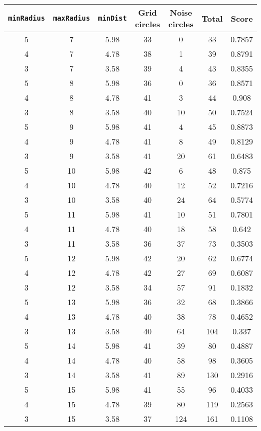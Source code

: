 \documentclass[letterpaper, 12pt]{article}
\begin{document}
\begin{longtable}{|c|c|c|c|c|c|c|}
\hline
\textbf{\texttt{minRadius}} & \textbf{\texttt{maxRadius}} & \textbf{\texttt{minDist}} & \textbf{Grid circles} & \textbf{Noise circles} & \textbf{Total} & \textbf{Score} \\
\hline
5 & 7 & 5.98 & 33 & 0 & 33 & 0.7857 \\
\hline
4 & 7 & 4.78 & 38 & 1 & 39 & 0.8791 \\
\hline
3 & 7 & 3.58 & 39 & 4 & 43 & 0.8355 \\
\hline
5 & 8 & 5.98 & 36 & 0 & 36 & 0.8571 \\
\hline
4 & 8 & 4.78 & 41 & 3 & 44 & 0.908 \\
\hline
3 & 8 & 3.58 & 40 & 10 & 50 & 0.7524 \\
\hline
5 & 9 & 5.98 & 41 & 4 & 45 & 0.8873 \\
\hline
4 & 9 & 4.78 & 41 & 8 & 49 & 0.8129 \\
\hline
3 & 9 & 3.58 & 41 & 20 & 61 & 0.6483 \\
\hline
5 & 10 & 5.98 & 42 & 6 & 48 & 0.875 \\
\hline
4 & 10 & 4.78 & 40 & 12 & 52 & 0.7216 \\
\hline
3 & 10 & 3.58 & 40 & 24 & 64 & 0.5774 \\
\hline
5 & 11 & 5.98 & 41 & 10 & 51 & 0.7801 \\
\hline
4 & 11 & 4.78 & 40 & 18 & 58 & 0.642 \\
\hline
3 & 11 & 3.58 & 36 & 37 & 73 & 0.3503 \\
\hline
5 & 12 & 5.98 & 42 & 20 & 62 & 0.6774 \\
\hline
4 & 12 & 4.78 & 42 & 27 & 69 & 0.6087 \\
\hline
3 & 12 & 3.58 & 34 & 57 & 91 & 0.1832 \\
\hline
5 & 13 & 5.98 & 36 & 32 & 68 & 0.3866 \\
\hline
4 & 13 & 4.78 & 40 & 38 & 78 & 0.4652 \\
\hline
3 & 13 & 3.58 & 40 & 64 & 104 & 0.337 \\
\hline
5 & 14 & 5.98 & 41 & 39 & 80 & 0.4887 \\
\hline
4 & 14 & 4.78 & 40 & 58 & 98 & 0.3605 \\
\hline
3 & 14 & 3.58 & 41 & 89 & 130 & 0.2916 \\
\hline
5 & 15 & 5.98 & 41 & 55 & 96 & 0.4033 \\
\hline
4 & 15 & 4.78 & 39 & 80 & 119 & 0.2563 \\
\hline
3 & 15 & 3.58 & 37 & 124 & 161 & 0.1108 \\

\end{longtable}
\end{document}
